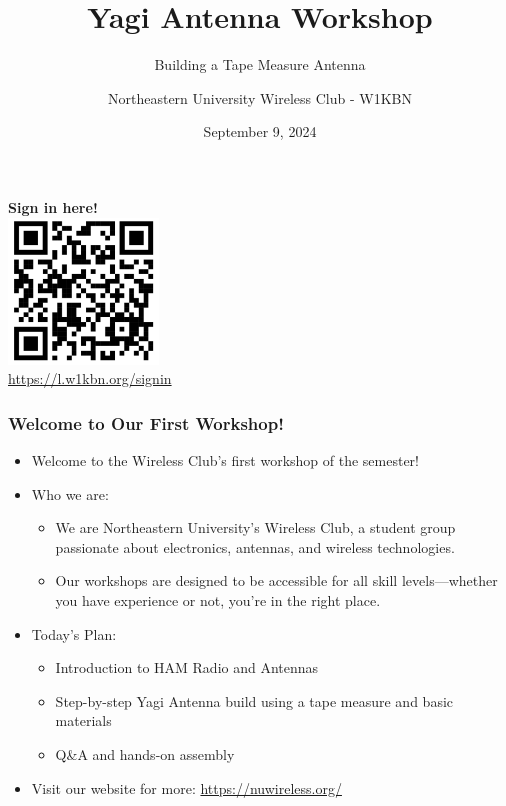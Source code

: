 \documentclass{beamer}
\title{Yagi Antenna Workshop}
\subtitle{Building a Tape Measure Antenna}
\author{Northeastern University Wireless Club - W1KBN}
\date{September 9, 2024}
\begin{document}
\begin{frame}
    \titlepage
    \vspace{-1cm} %
    \begin{center}
        \textbf{Sign in here!} \\
        \includegraphics[width=0.30\textwidth]{qrcode.png} %
        \vspace{-0.3cm} %
        \\
        {\small \url{https://l.w1kbn.org/signin}} %
    \end{center}
\end{frame}

\begin{frame}
    \frametitle{Welcome to Our First Workshop!}
    \begin{itemize}
        \item Welcome to the Wireless Club's first workshop of the semester!
        \item Who we are:
        \begin{itemize}
            \item We are Northeastern University's Wireless Club, a student group passionate about electronics, antennas, and wireless technologies.
            \item Our workshops are designed to be accessible for all skill levels—whether you have experience or not, you’re in the right place.
        \end{itemize}
        \item Today’s Plan:
        \begin{itemize}
            \item Introduction to HAM Radio and Antennas
            \item Step-by-step Yagi Antenna build using a tape measure and basic materials
            \item Q&A and hands-on assembly
        \end{itemize}
        \item Visit our website for more: \url{https://nuwireless.org/}
    \end{itemize}
\end{frame}
\end{document}
